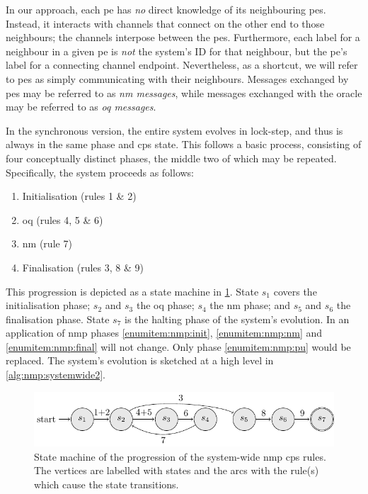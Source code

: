 In our approach, each \gls{pe} has \emph{no} direct knowledge of its neighbouring \glspl{pe}.  Instead, it interacts with channels that connect on the other end to those neighbours; the channels interpose between the \glspl{pe}.  Furthermore, each label for a neighbour in a given \gls{pe} is \emph{not} the system's ID for that neighbour, but the \gls{pe}'s label for a connecting channel endpoint.  Nevertheless, as a shortcut, we will refer to \glspl{pe} as simply communicating with their neighbours.  Messages exchanged by \glspl{pe} may be referred to as \emph{\acrfull{nm} messages}, while messages exchanged with the oracle may be referred to as \emph{\acrfull{oq} messages}.

In the synchronous version, the entire system evolves in lock-step, and thus is always in the same phase and \gls{cps} state.  This follows a basic process, consisting of four conceptually distinct phases, the middle two of which may be repeated.  Specifically, the system proceeds as follows:

\begin{enumerate}
    \item\label{enumitem:nmp:init} Initialisation (rules 1 \& 2)
    \item\label{enumitem:nmp:pu} \Gls{oq} (rules 4, 5 \& 6)
    \item\label{enumitem:nmp:nm} \Gls{nm} (rule 7)
    \item\label{enumitem:nmp:final} Finalisation (rules 3, 8 \& 9)
\end{enumerate}

This progression is depicted as a state machine in \cref{fig:nmp:systemwidestatemachine}.  State \(s_1\) covers the initialisation phase; \(s_2\) and \(s_3\) the \gls{oq} phase; \(s_4\) the \gls{nm} phase; and \(s_5\) and \(s_6\) the finalisation phase.  State \(s_7\) is the halting phase of the system's evolution.  In an application of \gls{nmp} phases \ref{enumitem:nmp:init}, \ref{enumitem:nmp:nm} and \ref{enumitem:nmp:final} will not change.  Only phase \ref{enumitem:nmp:pu} would be replaced.  The system's evolution is sketched at a high level in \cref{alg:nmp:systemwide2}.

\begin{figure}
    \centering
    \includegraphics{chapters/nmp/images/systemwidestatemachine.pdf}
    \caption[State machine of the progression of the system-wide \acrlong{nmp} \gls{cps} rules.]{State machine of the progression of the system-wide \gls{nmp} \gls{cps} rules.  The vertices are labelled with states and the arcs with the rule(s) which cause the state transitions.}
    \label{fig:nmp:systemwidestatemachine}
\end{figure}

